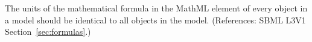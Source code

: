 The units of the mathematical formula in the MathML  element of
every \KineticLaw object in a model should be identical to all \KineticLaw
objects in the model.  (References: SBML L3V1 Section~\ref{sec:formulas}.)
